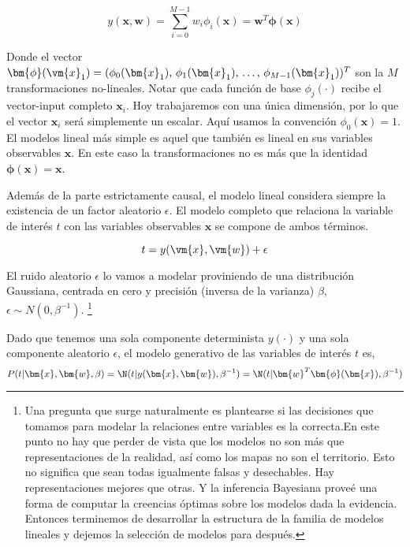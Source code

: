 \documentclass[a4paper,10pt]{article}
\begin{document}
\begin{equation}
y(\bm{x},\bm{w}) = \sum_{i=0}^{M-1} w_i \phi_i(\bm{x}) = \bm{w}^T \bm{\phi}(\bm{x})
\end{equation}
 
Donde el vector $\bm{\phi}(\vm{x}_1) = ( \phi_0(\bm{x}_1), \, \phi_1(\bm{x}_1) , \, \dots , \, \phi_{M-1}(\bm{x}_1) )^T$ son la $M$ transformaciones no-lineales.
Notar que cada funci\'on de base $\phi_j(\cdot)$ recibe el vector-input completo $\bm{x}_i$.
Hoy trabajaremos con una \'unica dimensi\'on, por lo que el vector $\bm{x}_i$ ser\'a simplemente un escalar.
Aqu\'i usamos la convenci\'on $\phi_0(\bm{x})=1$.
El modelos lineal m\'as simple es aquel que tambi\'en es lineal en sus variables observables $\bm{x}$.
En este caso la transformaciones no es m\'as que la identidad $\bm{\phi}(\bm{x})=\bm{x}$.

Adem\'as de la parte estrictamente causal, el modelo lineal considera siempre la existencia de un factor aleatorio $\epsilon$.
El modelo completo que relaciona la variable de inter\'es $t$ con las variables observables $\bm{x}$ se compone de ambos t\'erminos.

\begin{equation}
 t = y(\vm{x},\vm{w}) + \epsilon
\end{equation}
 
El ruido aleatorio $\epsilon$ lo vamos a modelar proviniendo de una distribuci\'on Gaussiana, centrada en cero y precisi\'on (inversa de la varianza) $\beta$, $\epsilon \sim N(0,\beta^{-1})$.
\footnote{Una pregunta que surge naturalmente es plantearse si las decisiones que tomamos para modelar la relaciones entre variables es la correcta.En este punto no hay que perder de vista que los modelos no son m\'as que representaciones de la realidad, as\'i como los mapas no son el territorio.
Esto no significa que sean todas igualmente falsas y desechables.
Hay representaciones mejores que otras.
Y la inferencia Bayesiana prove\'e una forma de computar la creencias \'optimas sobre los modelos dada la evidencia.
Entonces terminemos de desarrollar la estructura de la familia de modelos lineales y dejemos la selecci\'on de modelos para despu\'es.}

Dado que tenemos una sola componente determinista $y(\cdot)$ y una sola componente aleatorio $\epsilon$, el modelo generativo de las variables de inter\'es $t$ es,
\begin{equation}
P(t | \bm{x}, \bm{w}, \beta) = \N(t | y(\bm{x},\bm{w}), \beta^{-1}) = \N(t | \bm{w}^T \bm{\phi}(\bm{x}) , \beta^{-1})
\end{equation}
\end{document}
